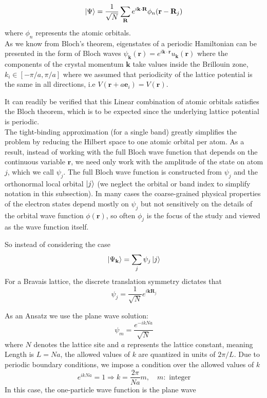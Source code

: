 \documentclass[11pt, a4paper]{article}
\theoremstyle{definition} %
\begin{document}
\begin{equation}
	\ket{\Psi} = \frac{1}{\sqrt{N}} \sum_{\mathbf{R}} e^{i\mathbf{k} \cdot \mathbf{R}} \phi_n(\mathbf{r} - \mathbf{R}_j)
\end{equation}
where $\phi_n$ represents the atomic orbitals. \\


As we know from Bloch's theorem, eigenstates of a periodic Hamiltonian can be presented in the form of Bloch waves $\psi_{\mathbf{k}}(\mathbf{r}) = e^{i\mathbf{k}\cdot \mathbf{r}} u_{\mathbf{k}}(\mathbf{r})$ where the components of the crystal momentum $\mathbf{k}$ take values inside the Brillouin zone, $k_i \in [-\pi/a, \pi/a]$ where we assumed that periodicity of the lattice potential is the same in all directions, i.e $V(\mathbf{r} + a\mathbf{e}_i) = V(\mathbf{r})$.

It can readily be verified that this Linear combination of atomic orbitals satisfies the Bloch theorem, which is to be expected since the underlying lattice potential is periodic. \\


The tight-binding approximation (for a single band) greatly simplifies the problem by reducing the Hilbert space to one atomic orbital per atom. As a result, instead of working with the full Bloch wave function that depends on the continuous variable $\mathbf{r}$, we need only work with the amplitude of the state on atom $j$, which we call $\psi_j$. The full Bloch wave function is constructed from $\psi_j$ and the orthonormal local orbital $\ket{j}$ (we neglect the orbital or band index to simplify notation in this subsection). In many cases the coarse-grained physical properties of the electron states depend mostly on $\psi_j$ but not sensitively on the details of the orbital wave function $\phi(\mathbf{r})$, so often $\phi_j$ is the focus of the study and viewed as the wave function itself.


So instead of considering the case
\begin{equation}
	\ket{\Psi_{\mathbf{k}}} = \sum_j \psi_j \ket{j}
\end{equation}
For a Bravais lattice, the discrete translation symmetry dictates that
\begin{equation}
	\psi_j = \frac{1}{\sqrt{N}} e^{i \mathbf{k} \mathbf{R}_j}
\end{equation}

As an Ansatz we use the plane wave solution:
\begin{equation}
	\psi_m = \frac{e^{-ikNa}}{\sqrt{N}}
\end{equation}
where $N$ denotes the lattice site and $a$ represents the lattice constant, meaning Length is $L = Na$, the allowed values of $k$ are quantized in units of $2\pi/L$. Due to periodic boundary conditions, we impose a condition over the allowed values of $k$
\begin{equation}
	e^{ikNa} = 1 \Rightarrow k = \frac{2\pi}{Na}m, \quad m:\text{ integer}
\end{equation}
In this case, the one-particle wave function is the plane wave
\end{document}

